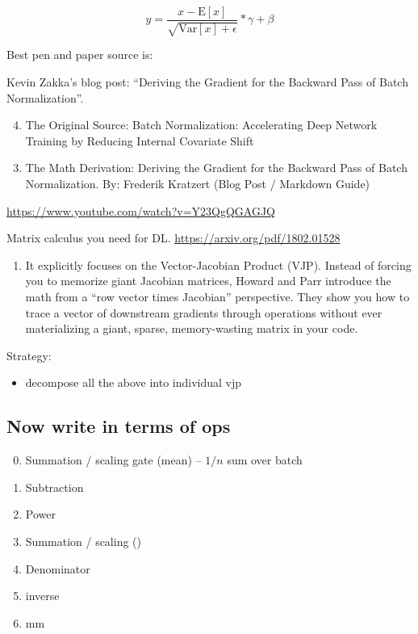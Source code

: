 \documentclass[11pt]{article}
\begin{document}
\[
y = \frac{x - \mathrm{E}[x]}{\sqrt{\mathrm{Var}[x] + \epsilon}} * \gamma + \beta
\]

Best pen and paper source is:

Kevin Zakka's blog post: ``Deriving the Gradient for the Backward Pass of Batch
Normalization''.

\begin{enumerate}
  \setcounter{enumi}{3}
  \item The Original Source: Batch Normalization: Accelerating Deep Network
        Training by Reducing Internal Covariate Shift
\end{enumerate}
\begin{enumerate}
  \setcounter{enumi}{2}
  \item The Math Derivation: Deriving the Gradient for the Backward Pass of
        Batch Normalization. By: Frederik Kratzert (Blog Post / Markdown Guide)
\end{enumerate}

\url{https://www.youtube.com/watch?v=Y23QgQGAGJQ}

Matrix calculus you need for DL. \url{https://arxiv.org/pdf/1802.01528}

\begin{enumerate}
  \item It explicitly focuses on the Vector-Jacobian Product (VJP). Instead of
        forcing you to memorize giant Jacobian matrices, Howard and Parr
        introduce the math from a ``row vector times Jacobian'' perspective.
        They show you how to trace a vector of downstream gradients through
        operations without ever materializing a giant, sparse, memory-wasting
        matrix in your code.
\end{enumerate}

Strategy:
\begin{itemize}
  \item decompose all the above into individual vjp
\end{itemize}

\subsection{Now write in terms of ops}

\begin{enumerate}
  \setcounter{enumi}{-1}
  \item Summation / scaling gate (mean) -- $1/n$ sum over batch
  \item Subtraction
  \item Power
  \item Summation / scaling ()
  \item Denominator
  \item inverse
  \item mm
\end{enumerate}
\end{document}
